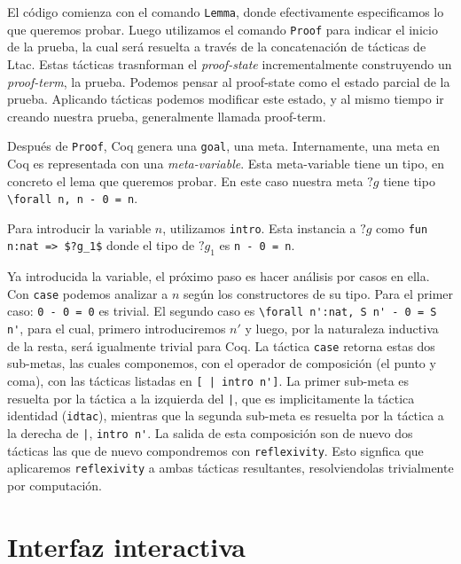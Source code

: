 El código comienza con el comando \lstinline{Lemma}, donde efectivamente especificamos lo que queremos probar.
Luego utilizamos el comando \lstinline{Proof} para indicar el inicio de la prueba, la cual será resuelta a través de la concatenación de tácticas de Ltac. Estas tácticas trasnforman el \textit{proof-state} incrementalmente construyendo un \textit{proof-term}, la prueba. Podemos pensar al proof-state como el estado parcial de la prueba. Aplicando tácticas podemos modificar este estado, y al mismo tiempo ir creando nuestra prueba, generalmente llamada proof-term.

Después de \lstinline{Proof}, Coq genera una \lstinline{goal}, una meta. Internamente, una meta en Coq es representada con una \textit{meta-variable}. Esta meta-variable tiene un tipo, en concreto el lema que queremos probar. En este caso nuestra meta $?g$ tiene tipo \lstinline{\forall n, n - 0 = n}.

Para introducir la variable $n$, utilizamos \lstinline{intro}. Esta instancia a $?g$ como \lstinline{fun n:nat => $?g_1$} donde el tipo de $?g_1$ es \lstinline{n - 0 = n}.

Ya introducida la variable, el próximo paso es hacer análisis por casos en ella. Con \lstinline{case} podemos analizar a $n$ según los constructores de su tipo. Para el primer caso: \lstinline{0 - 0 = 0} es trivial. El segundo caso es \lstinline{\forall n':nat, S n' - 0 = S n'}, para el cual, primero introduciremos $n'$ y luego, por la naturaleza inductiva de la resta, será igualmente trivial para Coq. La táctica \lstinline{case} retorna estas dos sub-metas, las cuales componemos, con el operador de composición (el punto y coma), con las tácticas listadas en \lstinline{[ | intro n']}. La primer sub-meta es resuelta por la táctica a la izquierda del \lstinline{|}, que es implicitamente la táctica identidad (\lstinline{idtac}), mientras que la segunda sub-meta es resuelta por la táctica a la derecha de \lstinline{|}, \lstinline{intro n'}. La salida de esta composición son de nuevo dos tácticas las que de nuevo compondremos con \lstinline{reflexivity}. Esto signfica que aplicaremos \lstinline{reflexivity} a ambas tácticas resultantes, resolviendolas trivialmente por computación.

\section{Interfaz interactiva}

